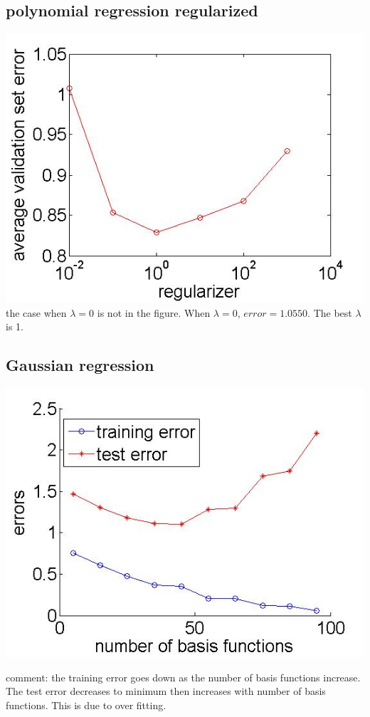 \documentclass[paper=a4, fontsize=11pt]{article} %
\begin{document}
\subsection{polynomial regression regularized}
\includegraphics[width=\linewidth]{poly_reg_reg.jpg}
the case when $\lambda=0$ is not in the figure. When $\lambda  =0$, $error = 1.0550$. The best $\lambda$ is 1.


\subsection{Gaussian regression}
\includegraphics[width=\linewidth]{gaussian_regression.jpg}

comment: the training error goes down as the number of basis functions increase. The test error decreases to minimum then increases with number of basis functions. This is due to over fitting.
\end{document}
